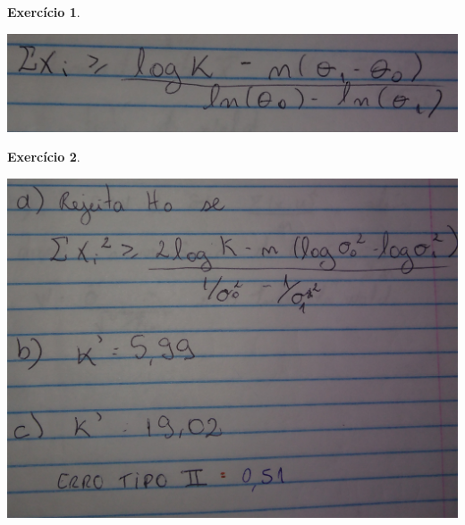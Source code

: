 \documentclass[letter,11pt]{article}
\newtheorem{exer}{Exercício}
\begin{document}
\begin{exer} \rm 
\end{exer}
\includegraphics[scale=0.1]{Ex12_gabarito}


\begin{exer} \rm 
% 
% 
% 
% 
% 
\end{exer}
\includegraphics[scale=0.1]{Ex13_gabarito}
\end{document}
